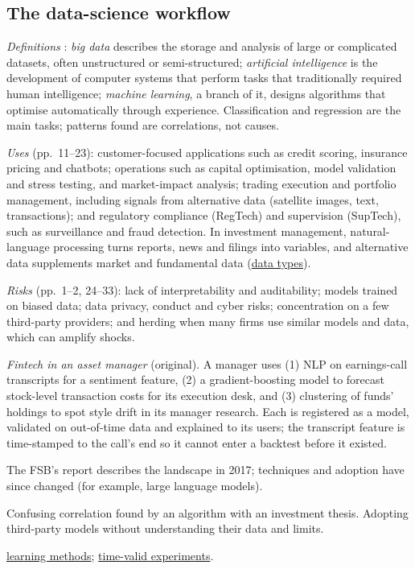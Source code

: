 \subsection{The data-science workflow}

\begin{qfdefinition}\label{def:financial-data-science-uses}
 \emph{Definitions} \citep[pp.~4--6]{fsb-ai-ml-2017}: \emph{big data} describes the storage and analysis of large or complicated datasets, often unstructured or semi-structured; \emph{artificial intelligence} is the development of computer systems that perform tasks that traditionally required human intelligence; \emph{machine learning}, a branch of it, designs algorithms that optimise automatically through experience. Classification and regression are the main tasks; patterns found are correlations, not causes.

\emph{Uses} (pp.~11--23): customer-focused applications such as credit scoring, insurance pricing and chatbots; operations such as capital optimisation, model validation and stress testing, and market-impact analysis; trading execution and portfolio management, including signals from alternative data (satellite images, text, transactions); and regulatory compliance (RegTech) and supervision (SupTech), such as surveillance and fraud detection. In investment management, natural-language processing turns reports, news and filings into variables, and alternative data supplements market and fundamental data (\hyperref[def:financial-data-types]{data types}).

\emph{Risks} (pp.~1--2, 24--33): lack of interpretability and auditability; models trained on biased data; data privacy, conduct and cyber risks; concentration on a few third-party providers; and herding when many firms use similar models and data, which can amplify shocks.

 \emph{Fintech in an asset manager} (original). A manager uses (1) NLP on earnings-call transcripts for a sentiment feature, (2) a gradient-boosting model to forecast stock-level transaction costs for its execution desk, and (3) clustering of funds' holdings to spot style drift in its manager research. Each is registered as a model, validated on out-of-time data and explained to its users; the transcript feature is time-stamped to the call's end so it cannot enter a backtest before it existed.

 The FSB's report describes the landscape in 2017; techniques and adoption have since changed (for example, large language models).

 Confusing correlation found by an algorithm with an investment thesis. Adopting third-party models without understanding their data and limits.

 \hyperref[def:learning-methods-overfitting]{learning methods}; \hyperref[meth:time-valid-ml-experiment-record]{time-valid experiments}.

\end{qfdefinition}

